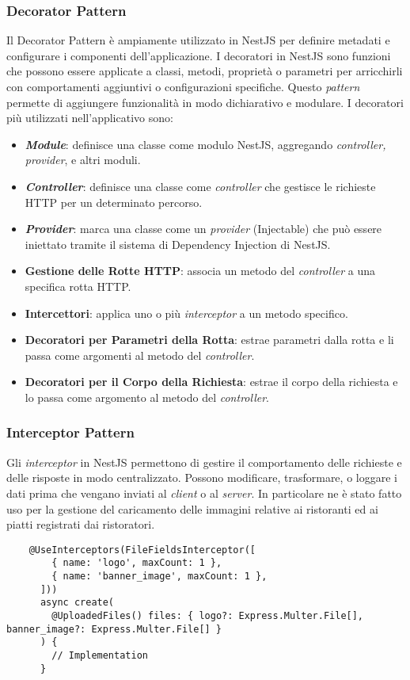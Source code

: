 \subsubsection{Decorator Pattern}
Il Decorator Pattern è ampiamente utilizzato in NestJS per definire metadati e configurare i componenti dell'applicazione. 
I decoratori in NestJS sono funzioni che possono essere applicate a classi, metodi, proprietà o parametri per arricchirli con comportamenti aggiuntivi o configurazioni specifiche. 
Questo \textit{pattern} permette di aggiungere funzionalità in modo dichiarativo e modulare.
I decoratori più utilizzati nell'applicativo sono:
\begin{itemize}
	\item \textbf{\textit{Module}}: definisce una classe come modulo NestJS, aggregando \textit{controller, provider}, e altri moduli.
	\item \textbf{\textit{Controller}}: definisce una classe come \textit{controller} che gestisce le richieste HTTP per un determinato percorso.
	\item \textbf{\textit{Provider}}: marca una classe come un \textit{provider} (Injectable) che può essere iniettato tramite il sistema di Dependency Injection di NestJS.
	\item \textbf{Gestione delle Rotte HTTP}: associa un metodo del \textit{controller} a una specifica rotta HTTP.
	\item \textbf{Intercettori}: applica uno o più \textit{interceptor} a un metodo specifico.
	\item \textbf{Decoratori per Parametri della Rotta}: estrae parametri dalla rotta e li passa come argomenti al metodo del \textit{controller}.
	\item \textbf{Decoratori per il Corpo della Richiesta}: estrae il corpo della richiesta e lo passa come argomento al metodo del \textit{controller}.
\end{itemize}


\subsubsection{Interceptor Pattern}
Gli \textit{interceptor} in NestJS permettono di gestire il comportamento delle richieste e delle risposte in modo centralizzato. 
Possono modificare, trasformare, o loggare i dati prima che vengano inviati al \textit{client} o al \textit{server}.
In particolare ne è stato fatto uso per la gestione del caricamento delle immagini relative ai ristoranti ed ai piatti registrati dai ristoratori.
\begin{lstlisting}
	@UseInterceptors(FileFieldsInterceptor([
		{ name: 'logo', maxCount: 1 },
		{ name: 'banner_image', maxCount: 1 },
	  ]))
	  async create(
		@UploadedFiles() files: { logo?: Express.Multer.File[], banner_image?: Express.Multer.File[] }
	  ) {
		// Implementation
	  }
\end{lstlisting}
